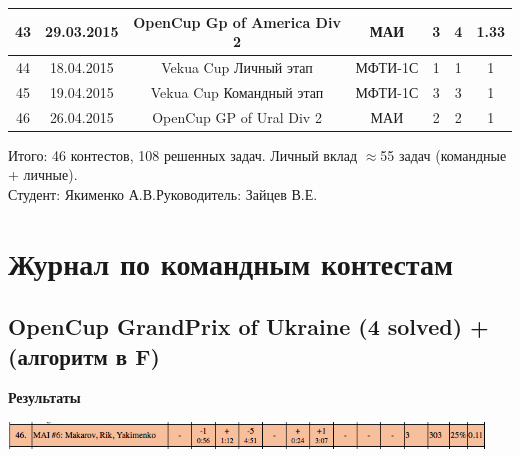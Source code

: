\documentclass[a4paper,12pt]{article}
\begin{document}
\begin{table}[ht!]
\begin{tabular}{|c|c|c|c|c|c|c|}
43 & 29.03.2015 & OpenCup Gp of America Div 2 & МАИ & 3 & 4 & 1.33 \\ \hline

44 & 18.04.2015 & Vekua Cup Личный этап & МФТИ-1С & 1 & 1 & 1 \\ \hline

45 & 19.04.2015 & Vekua Cup Командный этап & МФТИ-1С & 3 & 3 & 1 \\ \hline

46 & 26.04.2015 & OpenCup GP of Ural Div 2 & МАИ & 2 & 2 & 1 \\ \hline

\end{tabular}
\end{table}

Итого: 46 контестов, 108 решенных задач. Личный вклад $\approx$55 задач (командные + личные). \\

\noindent Студент:\underline{\hspace{3cm}} Якименко А.В.\hfill Руководитель:\underline{\hspace{3cm}} Зайцев В.Е.




\newpage
\section{Журнал по командным контестам}



%
%
\subsection{OpenCup GrandPrix of Ukraine (4 solved) + (алгоритм в F)}

\textbf{{\large Результаты}} \\
\begin{center}
\includegraphics[width=0.95\textwidth]{OC_Ukraine/result.png}\\ [1cm]
\end{center}
\end{document}
